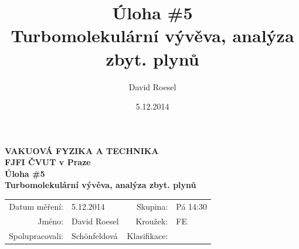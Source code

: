 \documentclass[english]{article}
\newcommand{\Author}{David Roesel}
\newcommand{\Coauthor}{Schönfeldová} %
\newcommand{\Institute}{FJFI ČVUT v Praze}
\newcommand{\Subject}{VAKUOVÁ FYZIKA A TECHNIKA}
\newcommand{\Group}{Pá 14:30}
\newcommand{\Kruh}{FE}
\newcommand{\Title}{Úloha \#5  \\Turbomolekulární vývěva, analýza zbyt. plynů}
\newcommand{\Date}{5.12.2014}
\begin{document}
\author{\Author}
\title{\Title}
\date{\Date}

\renewcommand{\figurename}{Obr.}
\renewcommand{\tablename}{Tab.}
\renewcommand{\refname}{Reference}


\setlength{\parindent}{0cm}
\begin{multicols}{2}
\textbf{\Subject \\
        \Institute \\[0.1cm]
\Title \\[0.5cm]
}
\begin{tabular}{rlrl}
\large Datum měření: & \Date & \large Skupina: & \Group \\
\large Jméno: & \Author & \large Kroužek:  & \Kruh\\
\large Spolupracovali: & \Coauthor &\large Klasifikace:\\
\end{tabular}


\end{multicols}
\end{document}

